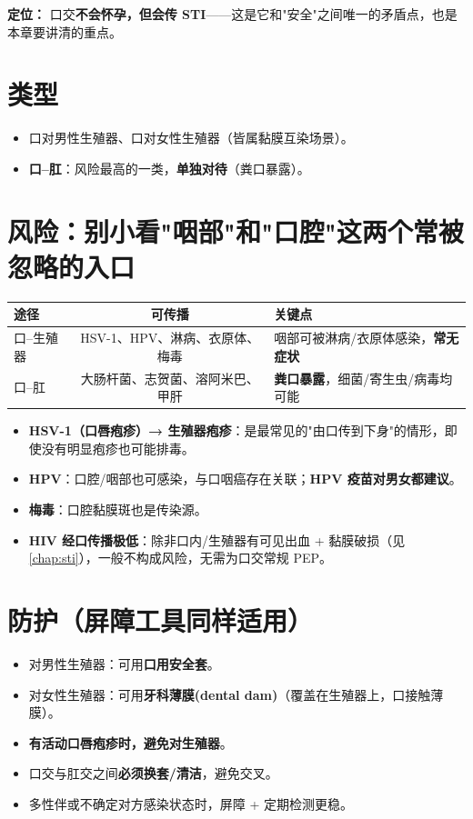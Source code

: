 \noindent\textbf{定位：} 口交\textbf{不会怀孕，但会传 STI}——这是它和"安全"之间唯一的矛盾点，也是本章要讲清的重点。

\section{类型}

\begin{itemize}[leftmargin=2em,itemsep=0.3em]
  \item 口对男性生殖器、口对女性生殖器（皆属黏膜互染场景）。
  \item \textbf{口--肛}：风险最高的一类，\textbf{单独对待}（粪口暴露）。
\end{itemize}

\section{风险：别小看"咽部"和"口腔"这两个常被忽略的入口}

\begin{tabularx}{\textwidth}{lC X}
\toprule
途径 & 可传播 & 关键点 \\
\midrule
口--生殖器 & HSV-1、HPV、淋病、衣原体、梅毒 & 咽部可被淋病/衣原体感染，\textbf{常无症状} \\
口--肛 & 大肠杆菌、志贺菌、溶阿米巴、甲肝 & \textbf{粪口暴露}，细菌/寄生虫/病毒均可能 \\
\bottomrule
\end{tabularx}

\vspace{0.5em}
\begin{itemize}[leftmargin=2em,itemsep=0.3em]
  \item \textbf{HSV-1（口唇疱疹）→ 生殖器疱疹}：是最常见的"由口传到下身"的情形，即使没有明显疱疹也可能排毒。
  \item \textbf{HPV}：口腔/咽部也可感染，与口咽癌存在关联；\textbf{HPV 疫苗对男女都建议}。
  \item \textbf{梅毒}：口腔黏膜斑也是传染源。
  \item \textbf{HIV 经口传播极低}：除非口内/生殖器有可见出血 + 黏膜破损（见\ref{chap:sti}），一般不构成风险，无需为口交常规 PEP。
\end{itemize}

\section{防护（屏障工具同样适用）}

\begin{itemize}[leftmargin=2em,itemsep=0.3em]
  \item 对男性生殖器：可用\textbf{口用安全套}。
  \item 对女性生殖器：可用\textbf{牙科薄膜(dental dam)}（覆盖在生殖器上，口接触薄膜）。
  \item \textbf{有活动口唇疱疹时，避免对生殖器}。
  \item 口交与肛交之间\textbf{必须换套/清洁}，避免交叉。
  \item 多性伴或不确定对方感染状态时，屏障 + 定期检测更稳。
\end{itemize}


